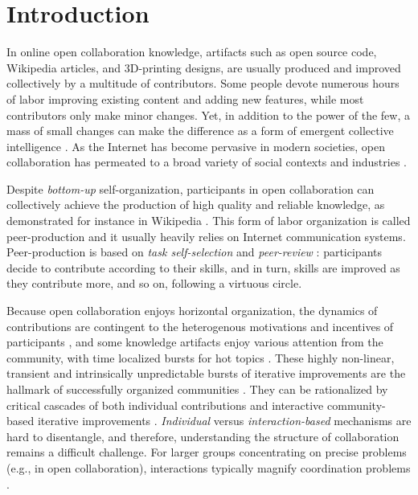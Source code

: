 \section{Introduction}
In online open collaboration knowledge, artifacts such as open source code, Wikipedia articles, and 3D-printing designs, are usually produced and improved collectively by a multitude of contributors. Some people devote numerous hours of labor improving existing content and adding new features, while most contributors only make minor changes. Yet, in addition to the power of the few, a mass of small changes can make the difference as a form of emergent collective intelligence \cite{kittur2007power}.  As the Internet has become pervasive in modern societies, open collaboration has permeated to a broad variety of social contexts and industries \cite{benkler2011leviathan}. 

Despite {\it bottom-up} self-organization, participants in open collaboration can collectively achieve  the production of high quality and reliable knowledge, as demonstrated for instance in Wikipedia \cite{giles2005internet}. This form of labor organization is called peer-production and it usually heavily relies on Internet communication systems. Peer-production is based on {\it task self-selection} and {\it peer-review} \cite{benkler2002}: participants decide to contribute according to their skills, and in turn, skills are improved as they contribute more, and so on, following a virtuous circle.

Because open collaboration enjoys horizontal organization, the dynamics of contributions are contingent to the heterogenous motivations and incentives of participants \cite{vonKrogh2012}, and some knowledge artifacts enjoy various attention from the community, with time localized bursts for hot topics \cite{keegan2013hotoff}. These  highly non-linear, transient and intrinsically unpredictable bursts of iterative improvements are the hallmark of successfully organized communities \cite{vonkrogh2014designing}. They can be rationalized by critical cascades of both individual contributions and interactive community-based iterative improvements \cite{sornette2014howmuch}. {\it Individual} versus {\it interaction-based} mechanisms are hard to disentangle, and therefore, understanding the structure of collaboration remains a difficult challenge. For larger groups concentrating on precise problems (e.g., in open collaboration), interactions typically magnify coordination problems \cite{halfaker2013}. %

